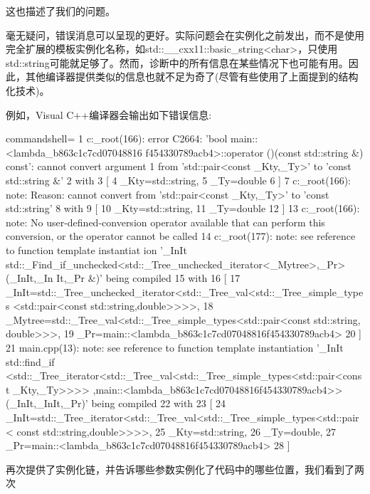 这也描述了我们的问题。

毫无疑问，错误消息可以呈现的更好。实际问题会在实例化之前发出，而不是使用完全扩展的模板实例化名称，如std::\_\_cxx11::basic\_string<char>，只使用std::string可能就足够了。然而，诊断中的所有信息在某些情况下也可能有用。因此，其他编译器提供类似的信息也就不足为奇了(尽管有些使用了上面提到的结构化技术)。

例如，Visual C++编译器会输出如下错误信息:

{\scriptsize
\begin{tcblisting}{commandshell={}}
1  c:\tools_root\cl\inc\algorithm(166): error C2664: ’bool main::<lambda_b863c1c7cd07048816
   f454330789acb4>::operator ()(const std::string &) const’: cannot convert argument 1 from
   ’std::pair<const _Kty,_Ty>’ to ’const std::string &’
2          with
3          [
4              _Kty=std::string,
5              _Ty=double
6          ]
7  c:\tools_root\cl\inc\algorithm(166): note: Reason: cannot convert from ’std::pair<const
   _Kty,_Ty>’ to ’const std::string’
8          with
9          [
10             _Kty=std::string,
11             _Ty=double
12         ]
13 c:\tools_root\cl\inc\algorithm(166): note: No user-defined-conversion operator available
   that can perform this conversion, or the operator cannot be called
14 c:\tools_root\cl\inc\algorithm(177): note: see reference to function template instantiat
   ion ’_InIt std::_Find_if_unchecked<std::_Tree_unchecked_iterator<_Mytree>,_Pr>(_InIt,_In
   It,_Pr &)’ being compiled
15         with
16         [
17              _InIt=std::_Tree_unchecked_iterator<std::_Tree_val<std::_Tree_simple_types
                <std::pair<const std::string,double>>>>,
18              _Mytree=std::_Tree_val<std::_Tree_simple_types<std::pair<const std::string,
                double>>>,
19              _Pr=main::<lambda_b863c1c7cd07048816f454330789acb4>
20         ]
21 main.cpp(13): note: see reference to function template instantiation ’_InIt std::find_if
   <std::_Tree_iterator<std::_Tree_val<std::_Tree_simple_types<std::pair<const _Kty,_Ty>>>>
   ,main::<lambda_b863c1c7cd07048816f454330789acb4>>(_InIt,_InIt,_Pr)’ being compiled
22         with
23         [
24             _InIt=std::_Tree_iterator<std::_Tree_val<std::_Tree_simple_types<std::pair<
               const std::string,double>>>>,
25             _Kty=std::string,
26             _Ty=double,
27             _Pr=main::<lambda_b863c1c7cd07048816f454330789acb4>
28         ]
\end{tcblisting}
}

再次提供了实例化链，并告诉哪些参数实例化了代码中的哪些位置，我们看到了两次

